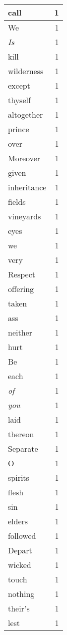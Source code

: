 \begin{center}
\begin{longtable}{l|r}
call & 1 \\ \hline
We & 1 \\ \hline
\emph{Is} & 1 \\ \hline
kill & 1 \\ \hline
wilderness & 1 \\ \hline
except & 1 \\ \hline
thyself & 1 \\ \hline
altogether & 1 \\ \hline
prince & 1 \\ \hline
over & 1 \\ \hline
Moreover & 1 \\ \hline
given & 1 \\ \hline
inheritance & 1 \\ \hline
fields & 1 \\ \hline
vineyards & 1 \\ \hline
eyes & 1 \\ \hline
we & 1 \\ \hline
very & 1 \\ \hline
Respect & 1 \\ \hline
offering & 1 \\ \hline
taken & 1 \\ \hline
ass & 1 \\ \hline
neither & 1 \\ \hline
hurt & 1 \\ \hline
Be & 1 \\ \hline
each & 1 \\ \hline
\emph{of} & 1 \\ \hline
\emph{you} & 1 \\ \hline
laid & 1 \\ \hline
thereon & 1 \\ \hline
Separate & 1 \\ \hline
O & 1 \\ \hline
spirits & 1 \\ \hline
flesh & 1 \\ \hline
sin & 1 \\ \hline
elders & 1 \\ \hline
followed & 1 \\ \hline
Depart & 1 \\ \hline
wicked & 1 \\ \hline
touch & 1 \\ \hline
nothing & 1 \\ \hline
their's & 1 \\ \hline
lest & 1 \\ \hline

\end{longtable}
\end{center}
